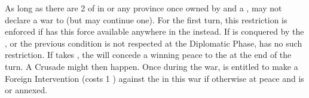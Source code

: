 \begin{digressions}


  \aparag As long as there are 2 \ARMY\faceplus of \HAB in \villeVienne or any
  province once owned by \paysHongrie and a \LeaderG, \TUR may not declare a
  war to \HAB (but may continue one). For the first turn, this restriction is
  enforced if \HAB has this force available anywhere in the \HRE instead.
  \aparag If \villeVienne is conquered by the \alliance, or the previous
  condition is not respected at the Diplomatic Phase, \TUR has no such
  restriction.
  \aparag If \TUR takes \villeVienne, the \ligue will concede a winning peace
  to the \alliance at the end of the turn. A Crusade might then happen.
  \aparag Once during the war, \TUR is entitled to make a Foreign Intervention
  (costs 1 \STAB) against the \ligue in this war if otherwise at peace and
  \paysTransylvanie is \VASSAL or annexed.




\end{digressions}
